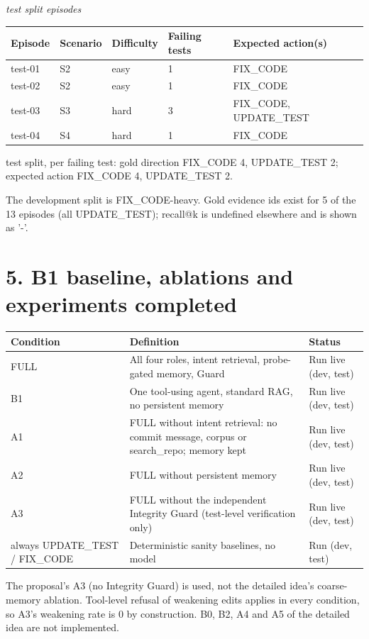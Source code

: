 \documentclass[10pt,a4paper]{article}
\begin{document}
{\small\itshape test split episodes}\par\nopagebreak
\begin{longtable}{|>{\raggedright\arraybackslash\footnotesize}p{}>{\raggedright\arraybackslash\footnotesize}p{}>{\raggedright\arraybackslash\footnotesize}p{}>{\raggedright\arraybackslash\footnotesize}p{}>{\raggedright\arraybackslash\footnotesize}p{}|}
\hline
\textbf{Episode} & \textbf{Scenario} & \textbf{Difficulty} & \textbf{Failing tests} & \textbf{Expected action(s)} \\ \hline\endhead
test-01 & S2 & easy & 1 & FIX\_CODE \\ \hline
test-02 & S2 & easy & 1 & FIX\_CODE \\ \hline
test-03 & S3 & hard & 3 & FIX\_CODE, UPDATE\_TEST \\ \hline
test-04 & S4 & hard & 1 & FIX\_CODE \\ \hline
\end{longtable}
test split, per failing test: gold direction FIX\_CODE 4, UPDATE\_TEST 2; expected action FIX\_CODE 4, UPDATE\_TEST 2.

The development split is FIX\_CODE-heavy. Gold evidence ids exist for 5 of the 13 episodes (all UPDATE\_TEST); recall@k is undefined elsewhere and is shown as '-'.

\section*{5. B1 baseline, ablations and experiments completed}
\begin{longtable}{|>{\raggedright\arraybackslash\footnotesize}p{}>{\raggedright\arraybackslash\footnotesize}p{}>{\raggedright\arraybackslash\footnotesize}p{}|}
\hline
\textbf{Condition} & \textbf{Definition} & \textbf{Status} \\ \hline\endhead
FULL & All four roles, intent retrieval, probe-gated memory, Guard & Run live (dev, test) \\ \hline
B1 & One tool-using agent, standard RAG, no persistent memory & Run live (dev, test) \\ \hline
A1 & FULL without intent retrieval: no commit message, corpus or search\_repo; memory kept & Run live (dev, test) \\ \hline
A2 & FULL without persistent memory & Run live (dev, test) \\ \hline
A3 & FULL without the independent Integrity Guard (test-level verification only) & Run live (dev, test) \\ \hline
always UPDATE\_TEST / FIX\_CODE & Deterministic sanity baselines, no model & Run (dev, test) \\ \hline
\end{longtable}
The proposal's A3 (no Integrity Guard) is used, not the detailed idea's coarse-memory ablation. Tool-level refusal of weakening edits applies in every condition, so A3's weakening rate is 0 by construction. B0, B2, A4 and A5 of the detailed idea are not implemented.
\end{document}
